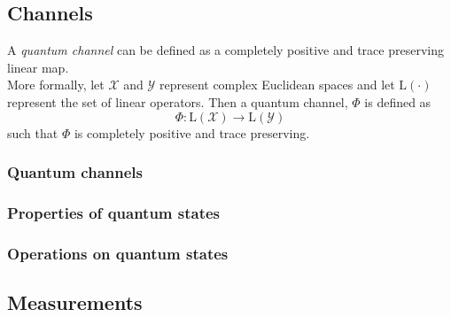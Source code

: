 \documentclass[nofootinbib,superscriptaddress,a4paper,twocolumn,longbibliography,floatfix,pra]{revtex4-2}
\newcommand{\setft}[1]{\mathrm{#1}}
\newcommand{\Lin}{\setft{L}}
\newcommand{\X}{\mathcal{X}}
\newcommand{\Y}{\mathcal{Y}}
\begin{document}
\subsection{Channels}
\label{sec:channels}

A \emph{quantum channel} can be defined as a completely positive and trace
preserving linear map.
\\

More formally, let $\X$ and $\Y$ represent complex Euclidean spaces and let
$\Lin(\cdot)$ represent the set of linear operators. Then a quantum channel,
$\Phi$ is defined as
\begin{equation}
    \Phi: \Lin(\X) \rightarrow \Lin(\Y)
\end{equation}
such that $\Phi$ is completely positive and trace preserving.

\subsubsection{Quantum channels}
\label{sec:quantum_channels}

\subsubsection{Properties of quantum states}
\label{sec:properties_of_quantum_states}

\subsubsection{Operations on quantum states}
\label{sec:operations_on_quantum_states}

\subsection{Measurements}
\label{sec:measurements}
\end{document}
